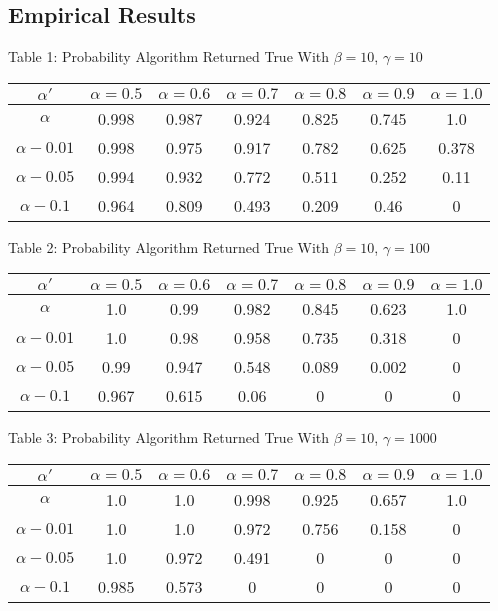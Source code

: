 \documentclass{article}
\begin{document}
\subsection{Empirical Results}
\begin{center}
Table 1: Probability Algorithm Returned True With $\beta=10$, $\gamma=10$ \\
\begin{tabular}{|c|c|c|c|c|c|c|}
\hline
$\alpha'$ & $\alpha = 0.5$ & $\alpha = 0.6$ & $\alpha = 0.7$ & $\alpha = 0.8$ & $\alpha = 0.9$ & $\alpha = 1.0$ \\
\hline
$\alpha$ & 0.998 & 0.987 & 0.924 & 0.825 & 0.745 & 1.0 \\
\hline
$\alpha-0.01$ & 0.998 & 0.975 & 0.917 & 0.782 & 0.625 & 0.378 \\
\hline
$\alpha-0.05$ & 0.994 & 0.932 & 0.772 & 0.511 & 0.252 & 0.11 \\
\hline
$\alpha-0.1$ & 0.964 & 0.809 & 0.493 & 0.209 & 0.46 & 0 \\
\hline
\end{tabular}
\end{center}

\begin{center}
Table 2: Probability Algorithm Returned True With $\beta=10$, $\gamma=100$ \\
\begin{tabular}{|c|c|c|c|c|c|c|}
\hline
$\alpha'$ & $\alpha = 0.5$ & $\alpha = 0.6$ & $\alpha = 0.7$ & $\alpha = 0.8$ & $\alpha = 0.9$ & $\alpha = 1.0$ \\
\hline
$\alpha$ & 1.0 & 0.99 & 0.982 & 0.845 & 0.623 & 1.0 \\
\hline
$\alpha-0.01$ & 1.0 & 0.98 & 0.958 & 0.735 & 0.318 & 0 \\
\hline
$\alpha-0.05$ & 0.99 & 0.947 & 0.548 & 0.089 & 0.002 & 0 \\
\hline
$\alpha-0.1$ & 0.967 & 0.615 & 0.06 & 0 & 0 & 0 \\
\hline
\end{tabular}
\end{center}

\begin{center}
Table 3: Probability Algorithm Returned True With $\beta=10$, $\gamma=1000$ \\
\begin{tabular}{|c|c|c|c|c|c|c|}
\hline
$\alpha'$ & $\alpha = 0.5$ & $\alpha = 0.6$ & $\alpha = 0.7$ & $\alpha = 0.8$ & $\alpha = 0.9$ & $\alpha = 1.0$ \\
\hline
$\alpha$ & 1.0 & 1.0 & 0.998 & 0.925 & 0.657 & 1.0 \\
\hline
$\alpha-0.01$ & 1.0 & 1.0 & 0.972 & 0.756 & 0.158 & 0 \\
\hline
$\alpha-0.05$ & 1.0 & 0.972 & 0.491 & 0 & 0 & 0 \\
\hline
$\alpha-0.1$ & 0.985 & 0.573 & 0 & 0 & 0 & 0 \\
\hline
\end{tabular}
\end{center}
\end{document}
